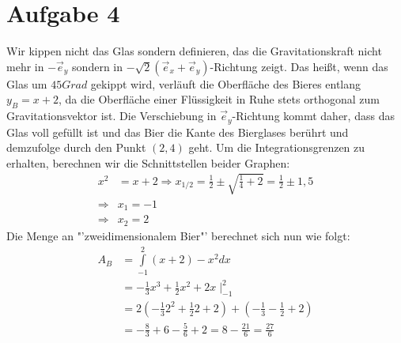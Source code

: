 \documentclass[10pt,a4paper,parskip=half]{scrartcl}
\begin{document}
\section*{Aufgabe 4}
Wir kippen nicht das Glas sondern definieren, das die Gravitationskraft nicht mehr in $-\vec e_y$ sondern in $-\sqrt 2 (\vec e_x + \vec e_y)$-Richtung zeigt. Das heißt, wenn das Glas um $45 Grad$ gekippt wird, verläuft die Oberfläche des Bieres entlang $y_B = x + 2$, da die Oberfläche einer Flüssigkeit in Ruhe stets orthogonal zum Gravitationsvektor ist. Die Verschiebung in $\vec e_y$-Richtung kommt daher, dass das Glas voll gefüllt ist und das Bier die Kante des Bierglases berührt und demzufolge durch den Punkt $(2,4)$ geht. Um die Integrationsgrenzen zu erhalten, berechnen wir die Schnittstellen beider Graphen:
\begin{align*}
x^2 &= x + 2 \Rightarrow x_{1/2} =  \frac 12 \pm \sqrt{ \frac 14 + 2} = \frac 12 \pm 1,5\\
\Rightarrow &x_1 = -1\\
\Rightarrow &x_2 = 2
\end{align*}
Die Menge an "'zweidimensionalem Bier"' berechnet sich nun wie folgt:
\begin{align*}
A_B &= \int\limits_{-1}^{2} (x+2) - x^2 dx\\
&= -\frac 13 x^3 + \frac 12 x^2 + 2x \mid_{-1}^{2}\\
&= 2\left(-\frac 13 2^2 + \frac 12 2 + 2\right) + \left(-\frac 13 -\frac 12 +2\right)\\
&= -\frac 83 + 6 - \frac 56 + 2 = 8 - \frac {21}6 = \frac {27}6
\end{align*}
\end{document}

